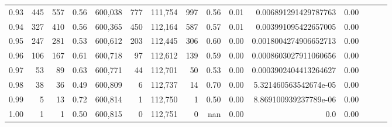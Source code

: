 \begin{tabular}{rrrrrrrrrrrrrrr}
0.93 &     445 &    557 &  0.56 &  600,038 &      777 &  111,754 &      997 &  0.56 &  0.01 &   0.006891291429787763 &      0.00 \\
0.94 &     327 &    410 &  0.56 &  600,365 &      450 &  112,164 &      587 &  0.57 &  0.01 &   0.003991095422657005 &      0.00 \\
0.95 &     247 &    281 &  0.53 &  600,612 &      203 &  112,445 &      306 &  0.60 &  0.00 &  0.0018004274906652713 &      0.00 \\
0.96 &     106 &    167 &  0.61 &  600,718 &       97 &  112,612 &      139 &  0.59 &  0.00 &  0.0008603027911060656 &      0.00 \\
0.97 &      53 &     89 &  0.63 &  600,771 &       44 &  112,701 &       50 &  0.53 &  0.00 &  0.0003902404413264627 &      0.00 \\
0.98 &      38 &     36 &  0.49 &  600,809 &        6 &  112,737 &       14 &  0.70 &  0.00 &  5.321460563542674e-05 &      0.00 \\
0.99 &       5 &     13 &  0.72 &  600,814 &        1 &  112,750 &        1 &  0.50 &  0.00 &  8.869100939237789e-06 &      0.00 \\
1.00 &       1 &      1 &  0.50 &  600,815 &        0 &  112,751 &        0 &   nan &  0.00 &                    0.0 &      0.00 \\
\bottomrule
\end{tabular}
